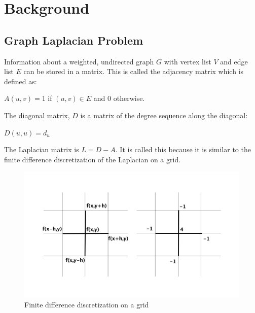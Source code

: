 %


\linespread{1.5}
%

\chapter{Background}
\section{Graph Laplacian Problem}
Information about a weighted, undirected graph $G$ with vertex list $V$ and edge list $E$ can be stored in a matrix. This is called the adjacency matrix which is defined as:\\
\begin{center} 
$A(u,v) = 1$ if $(u,v) \in E$ and $0$ otherwise.\\
\end{center}
The diagonal matrix, $D$ is a matrix of the degree sequence along the diagonal:\\
\begin{center}
$D(u,u) = d_u$
\end{center}
The Laplacian matrix is $L = D-A$. It is called this because it is similar to the finite difference discretization of the Laplacian on a grid.\\
\begin{figure}[H]
\begin{center}
\includegraphics[width=\linewidth]{laplace.png}
  \caption{Finite difference discretization on a grid}
  \end{center}
  \end{figure}
 
